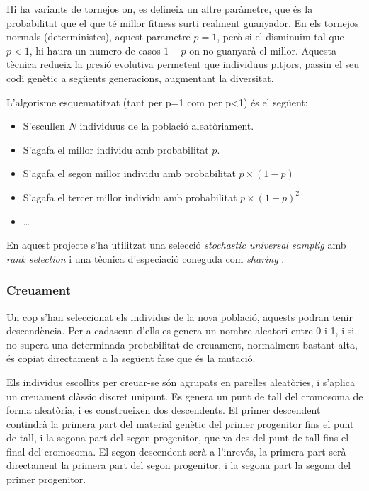 Hi ha variants de tornejos on, es defineix un altre paràmetre, que és la
probabilitat que el que té millor fitness surti realment guanyador.  En els
tornejos normals (deterministes), aquest parametre $p=1$, però si el disminuim
tal que $p<1$, hi haura un numero de casos $1-p$ on no guanyarà el millor.
Aquesta tècnica redueix la presió evolutiva permetent que individuus pitjors,
passin el seu codi genètic a següents generacions, augmentant la diversitat.

L'algorisme esquematitzat (tant per p=1 com per p<1) és el següent:

\begin{itemize}
	\item S'escullen $N$ individuus de la població aleatòriament.
	\item S'agafa el millor individu amb probabilitat $p$.
	\item S'agafa el segon millor individu amb probabilitat $p \times (1-p)$
	\item S'agafa el tercer millor individu amb probabilitat $p \times (1-p)^2$
	\item \ldots
\end{itemize}


En aquest projecte s'ha utilitzat una selecció \emph{stochastic
universal samplig} \cite{B87a} amb \emph{rank selection} \cite{B87b} i una
tècnica d'especiació coneguda com \emph{sharing} \cite{33}.

\subsubsection{Creuament}

Un cop s'han seleccionat els individus de la nova població, aquests podran tenir
descendència. Per a cadascun d'ells es genera un nombre aleatori entre 0 i 1, i
si no supera una determinada probabilitat de creuament, normalment bastant alta,
és copiat directament a la següent fase que és la mutació.

Els individus escollits per creuar-se són agrupats en parelles aleatòries, i
s'aplica un creuament clàssic discret unipunt.  Es genera un punt de tall del
cromosoma de forma aleatòria, i es construeixen dos descendents. El primer
descendent contindrà la primera part del material genètic del primer progenitor
fins el punt de tall, i la segona part del segon progenitor, que va des del punt
de tall fins el final del cromosoma. El segon descendent serà a l'inrevés, la
primera part serà directament la primera part del segon progenitor, i la segona
part la segona del primer progenitor.

